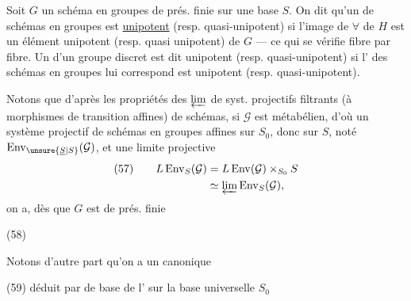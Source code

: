 Soit $G$ un schéma en groupes  de prés. finie sur une base $S$.
On dit qu'un  de schémas en groupes
est  \uline{unipotent} (resp. quasi-unipotent) si l'image de $\forall$  de $H$ est un élément unipotent (resp. quasi unipotent) de $G$ --- ce qui se vérifie fibre par fibre. Un  d'un groupe discret
est dit unipotent (resp. quasi-unipotent) si l' des schémas en groupes   lui correspond
est unipotent (resp. quasi-unipotent).



Notons que d'après les propriétés des $\varprojlim$ de syst. projectifs filtrants (à morphismes de transition affines)  de schémas, si $\mathcal{G}$ est métabélien, d'où un système projectif de schémas en groupes affines sur $S_0$, donc sur $S$, noté $\operatorname{Env}_{\unsure{\underline{S}|S}}(\mathcal{G})$, et une limite projective
\[
\begin{aligned}
(57)\qquad L\operatorname{Env}_S(\mathcal{G})
 &=L\operatorname{Env}(\mathcal{G})\times_{S_0}S\\
 &\simeq\varprojlim\operatorname{Env}_S(\mathcal{G}),
\end{aligned}
\]
on a, dès que $G$ est  de prés. finie

(58)\quad
{}

Notons d'autre part qu'on a un   canonique

(59)\quad
{}
déduit par  de base de l' sur la base universelle $S_0$

